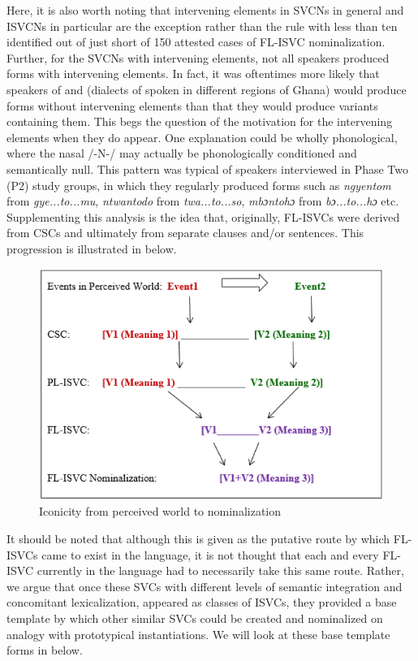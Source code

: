 \documentclass[output=paper
,newtxmath
,modfonts
,nonflat]{langsci/langscibook}
\begin{document}
Here, it is also worth noting that intervening elements in SVCNs in general and ISVCNs in particular are the exception rather than the rule with less than ten identified out of just short of 150 attested cases of FL-ISVC nominalization. Further, for the SVCNs with intervening elements, not all speakers produced forms with intervening elements. In fact, it was oftentimes more likely that speakers of  and  (dialects of  spoken in different regions of Ghana) would produce forms without intervening elements than that they would produce variants containing them. This begs the question of the motivation for the intervening elements when they do appear. One explanation could be wholly phonological, where the nasal /-N-/ may actually be phonologically conditioned and semantically null. This pattern was typical of  speakers interviewed in Phase Two (P2) study groups, in which they regularly produced forms such as \textit{ngyentom} from \textit{gye...to...mu}, \textit{ntwantodo} from \textit{twa...to...so}, \textit{mbɔntohɔ} from \textit{bɔ...to...hɔ} etc. Supplementing this analysis is the idea that, originally, FL-ISVCs were derived from CSCs and ultimately from separate clauses and/or sentences. This progression is illustrated in  below. 

\begin{figure}
\includegraphics[width=\textwidth]{fig-duah-1}
\caption{Iconicity from perceived world to nominalization \citep[41]{kambon2012}}
\label{fig:duah:2}
\end{figure}

It should be noted that although this is given as the putative route by which FL-ISVCs came to exist in the language, it is not thought that each and every FL-ISVC currently in the language had to necessarily take this same route. Rather, we argue that once these SVCs with different levels of semantic integration and concomitant lexicalization, appeared as classes of ISVCs, they provided a base template by which other similar SVCs could be created and nominalized on analogy with prototypical instantiations. We will look at these base template forms in  below.
\end{document}
